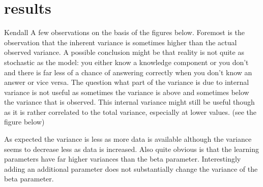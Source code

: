 \documentclass{scrartcl}
\begin{document}
\section{results}
Kendall
A few observations on the basis of the figures below. Foremost is the observation that the inherent variance is sometimes higher than the actual observed variance. A possible conclusion might be that reality is not quite as stochastic as the model: you either know a knowledge component or you don't and there is far less of a chance of answering correctly when you don't know an answer or vice versa. The question what part of the variance is due to internal variance is not useful as sometimes the variance is above and sometimes below the variance that is observed. This internal variance might still be useful though as it is rather correlated to the total variance, especially at lower values. (see the figure below)

As expected the variance is less as more data is available although the variance seems to decrease less as data is increased. Also quite obvious is that the learning parameters have far higher variances than the beta parameter. Interestingly adding an additional parameter does not substantially change the variance of the beta parameter.
\end{document}
